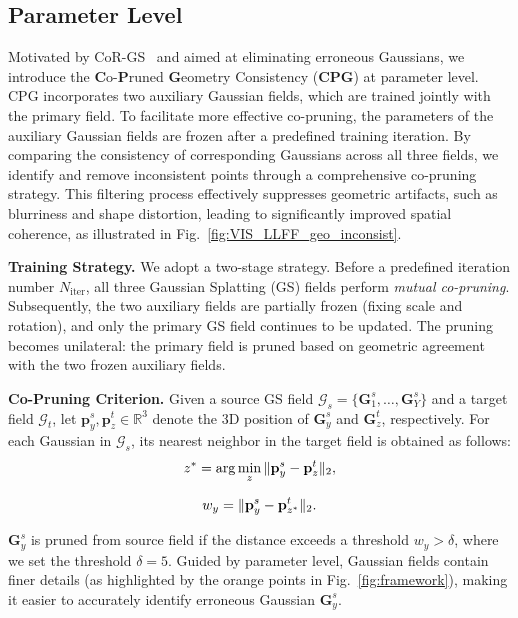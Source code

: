 \subsection{Parameter Level}

Motivated by CoR-GS~\cite{zhang2024cor} and aimed at eliminating erroneous Gaussians, we introduce the \textbf{C}o-\textbf{P}runed \textbf{G}eometry Consistency (\textbf{CPG})  at parameter level. CPG incorporates two auxiliary Gaussian fields, which are trained jointly with the primary field. To facilitate more effective co-pruning, the parameters of the auxiliary Gaussian fields are frozen after a predefined training iteration. By comparing the consistency of corresponding Gaussians across all three fields, we identify and remove inconsistent points through a comprehensive co-pruning strategy. This filtering process effectively suppresses geometric artifacts, such as blurriness and shape distortion, leading to significantly improved spatial coherence, as illustrated in Fig.~\ref{fig:VIS_LLFF_geo_inconsist}.

\textbf{Training Strategy.} We adopt a two-stage strategy. Before a predefined iteration number \( N_{\mathrm{iter}} \), all three Gaussian Splatting (GS) fields perform \emph{mutual co-pruning}. Subsequently, the two auxiliary fields are partially frozen (fixing scale and rotation), and only the primary GS field continues to be updated. The pruning becomes unilateral: the primary field is pruned based on geometric agreement with the two frozen auxiliary fields.

\textbf{Co-Pruning Criterion.} Given a source GS field \( \mathcal{G}_s = \{ \mathbf{G}^s_1, \dots, \mathbf{G}^s_{Y} \} \) and a target field \( \mathcal{G}_t \), let \( \mathbf{p}_y^s, \mathbf{p}_z^t \in \mathbb{R}^3 \) denote the 3D position of \( \mathbf{G}^s_y \) and \( \mathbf{G}^t_z \), respectively. For each Gaussian in $\mathcal{G}_s$, its nearest neighbor in the target field is obtained as follows:
\begin{equation}
\small
z^* = \arg\min_z \| \mathbf{p}_y^s - \mathbf{p}_z^t \|_2,
\end{equation}

\begin{equation}
\small
w_y = \| \mathbf{p}_y^s - \mathbf{p}_{z^*}^t \|_2.
\end{equation}

\( \mathbf{G}^s_y \) is pruned from source field if the distance exceeds a threshold $w_y > \delta$, where we set the threshold $\delta=5$. 
Guided by parameter level, Gaussian fields contain finer details (as highlighted by the orange points in Fig.~\ref{fig:framework}), making it easier to accurately identify erroneous Gaussian \( \mathbf{G}^s_y \).


